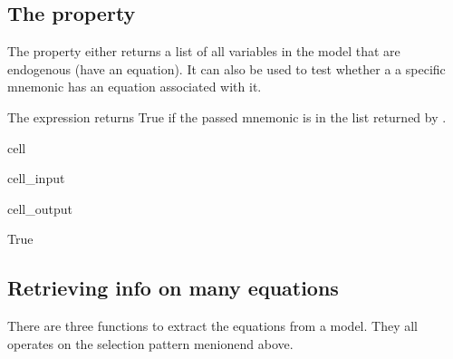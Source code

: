 \documentclass[letterpaper,10pt,english]{jupyterBook}
\begin{document}
\subsection{The  property}
\label{\detokenize{content/05_WBModels/LoadingWBModel:the-endogene-property}}
\sphinxAtStartPar
The   property either returns a list of all variables in the model that are endogenous (have an equation). It can also be used to test whether a a specific mnemonic has an equation associated with it.

\sphinxAtStartPar
The expression  returns True if the passed mnemonic is in the list returned by .

\begin{sphinxuseclass}{cell}\begin{sphinxVerbatimInput}

\begin{sphinxuseclass}{cell_input}
\begin{sphinxVerbatim}[commandchars=\\\{\}]
  
\end{sphinxVerbatim}

\end{sphinxuseclass}\end{sphinxVerbatimInput}
\begin{sphinxVerbatimOutput}

\begin{sphinxuseclass}{cell_output}
\begin{sphinxVerbatim}[commandchars=\\\{\}]
True
\end{sphinxVerbatim}

\end{sphinxuseclass}\end{sphinxVerbatimOutput}

\end{sphinxuseclass}

\subsection{Retrieving info on many equations}
\label{\detokenize{content/05_WBModels/LoadingWBModel:retrieving-info-on-many-equations}}
\sphinxAtStartPar
There are three functions to extract the equations from a model. They all operates on the selection pattern menionend above.
\end{document}
